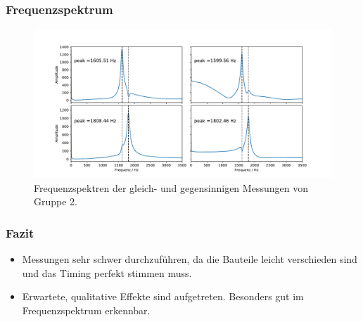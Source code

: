 \documentclass{beamer}
\begin{document}
\begin{frame}
\frametitle{Frequenzspektrum}
\begin{figure}
\includegraphics[width = \framewidth]{abbildungen/plotsLC/fundamental_fft.pdf}
\caption{Frequenzspektren der gleich- und gegensinnigen Messungen von Gruppe 2.}
\end{figure}
\end{frame}

\begin{frame}
\frametitle{Fazit}
\begin{itemize}
\item Messungen sehr schwer durchzuführen, da die Bauteile leicht verschieden sind und das Timing perfekt stimmen muss.
\item Erwartete, qualitative Effekte sind aufgetreten. Besonders gut im Frequenzspektrum erkennbar.
\end{itemize}
\end{frame}
\end{document}
